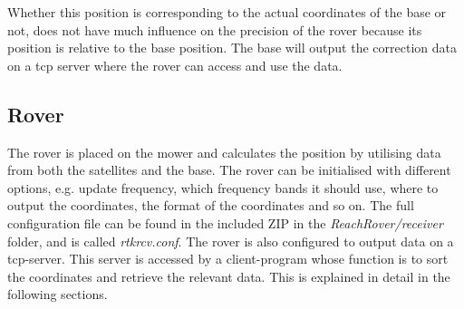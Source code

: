Whether this position is corresponding to the actual coordinates of the base or not, does not have much influence on the precision of the rover because its position is relative to the base position. The base will output the correction data on a \gls{tcp} server where the rover can access and use the data. 

\subsection{Rover}

The rover is placed on the mower and calculates the position by utilising data from both the satellites and the base. The rover can be initialised with different options, e.g. update frequency, which frequency bands it should use, where to output the coordinates, the format of the coordinates and so on. The full configuration file can be found in the included ZIP in the \textit{ReachRover/receiver} folder, and is called \textit{rtkrcv.conf}. The rover is also configured to output data on a \gls{tcp}-server. This server is accessed by a client-program whose function is to sort the coordinates and retrieve the relevant data. This is explained in detail in the following sections. 